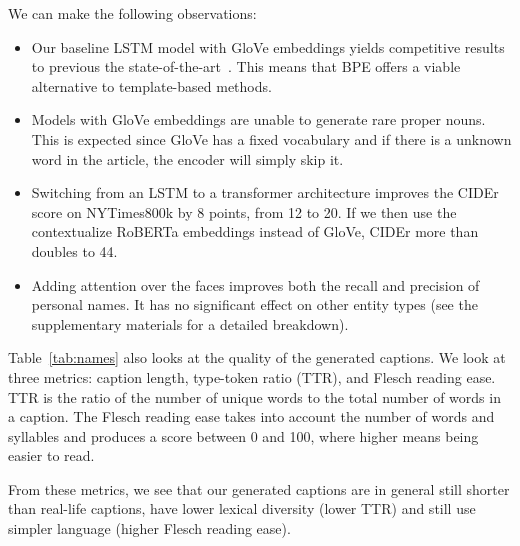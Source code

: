 We can make the following observations:

\begin{itemize}
   \item Our baseline LSTM model with GloVe embeddings yields competitive
   results to previous the state-of-the-art~\cite{Biten2019GoodNews}. This
   means that BPE offers a viable alternative to template-based methods.

   \item Models with GloVe embeddings are unable to generate rare proper nouns.
   This is expected since GloVe has a fixed vocabulary and if there is a
   unknown word in the article, the encoder will simply skip it.

   \item Switching from an LSTM to a transformer architecture improves the
   CIDEr score on NYTimes800k by 8 points, from 12 to 20. If we then use the
   contextualize RoBERTa embeddings instead of GloVe, CIDEr more than doubles
   to 44.

   \item Adding attention over the faces improves both the recall and precision
   of personal names. It has no significant effect on other entity types (see
   the supplementary materials for a detailed breakdown).
\end{itemize}


Table~\ref{tab:names} also looks at the quality of the generated captions. We
look at three metrics: caption length, type-token ratio (TTR), and Flesch
reading ease. TTR is the ratio of the number of unique words to the total
number of words in a caption. The Flesch reading ease takes into account the
number of words and syllables and produces a score between 0 and 100, where
higher means being easier to read.

From these metrics, we see that our generated captions are in general still
shorter than real-life captions, have lower lexical diversity (lower TTR)
and still use simpler language (higher Flesch reading ease).
